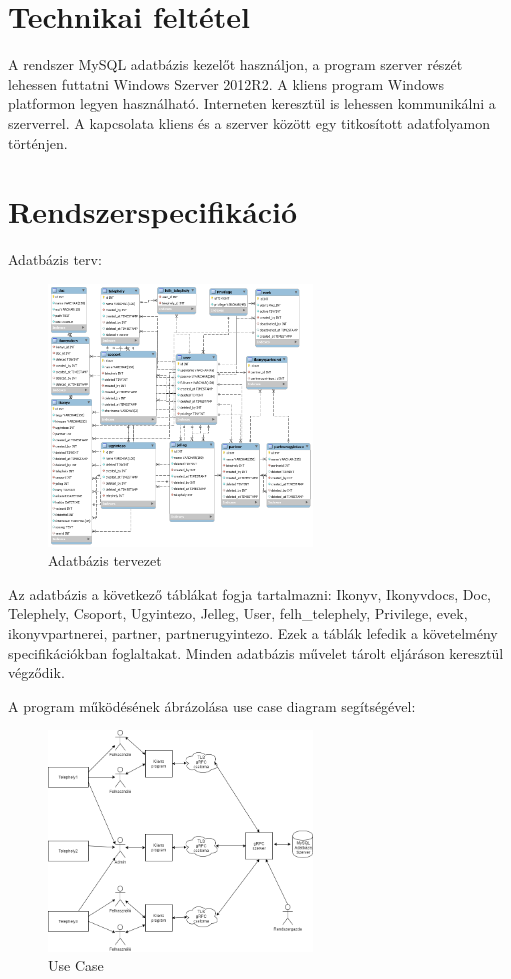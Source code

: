 \documentclass[
]{thesis-ekf}
\theoremstyle{definition}
\theoremstyle{remark}
\begin{document}
\begin{longtable}{|c|c|c|L|}
\end{longtable}

\section{Technikai feltétel}
A rendszer MySQL adatbázis kezelőt használjon, a program szerver részét lehessen futtatni Windows Szerver 2012R2. A kliens program Windows platformon legyen használható. Interneten keresztül is lehessen kommunikálni a szerverrel. A kapcsolata kliens és a szerver között egy titkosított adatfolyamon történjen.

\section {Rendszerspecifikáció}
Adatbázis terv:
\begin{figure}[th!]
	\centering
	\includegraphics[width=7cm]{adatbazisterv}
	\caption{Adatbázis tervezet}
	\label{fig:adatbazisterv}
\end{figure}
Az adatbázis a következő táblákat fogja tartalmazni: Ikonyv, Ikonyvdocs, Doc, Telephely, Csoport, Ugyintezo, Jelleg, User, felh\_telephely, Privilege, evek, ikonyvpartnerei, partner, partnerugyintezo. Ezek a táblák lefedik a követelmény specifikációkban foglaltakat. Minden adatbázis művelet tárolt eljáráson keresztül végződik.

A program működésének ábrázolása use case diagram segítségével:
\begin{figure}
	\centering
	\includegraphics[width=7cm]{archdiag}
	\caption[Use Case ábra]{Use Case}
	\label{fig:archdiag}
\end{figure}
\end{document}
